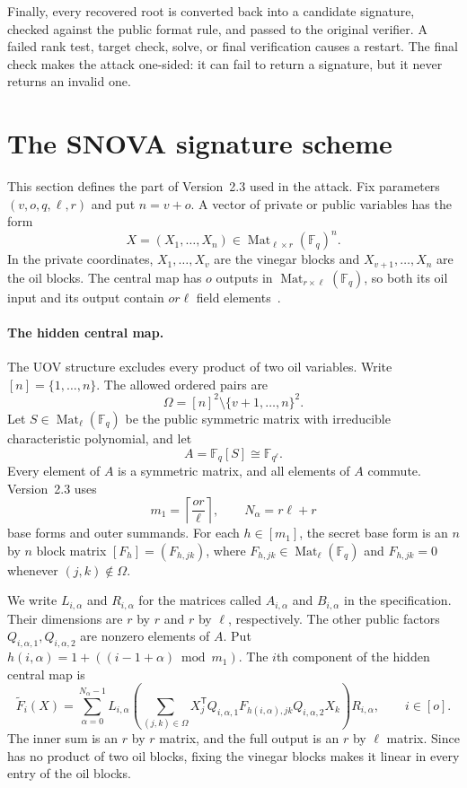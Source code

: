 \documentclass[11pt]{article}
\newcommand{\F}{\mathbb F}
\newcommand{\Mat}{\operatorname{Mat}}
\newcommand{\transpose}{\mathsf T}
\newcommand{\SNOVA}{\textsf{SNOVA}}
\begin{document}
Finally, every recovered root is converted back into a candidate signature,
checked against the public format rule, and passed to the original verifier.
A failed rank test, target check, solve, or final verification causes a
restart.  The final check makes the attack one-sided: it can fail to return a
signature, but it never returns an invalid one.

\section{The \SNOVA{} signature scheme}\label{sec:scheme}

This section defines the part of Version~2.3 used in the attack.  Fix
parameters $(v,o,q,\ell,r)$ and put $n=v+o$.  A vector of private or public
variables has the form
\[
 X=(X_1,\ldots,X_n)\in\Mat_{\ell\times r}(\F_q)^n.
\]
In the private coordinates, $X_1,\ldots,X_v$ are the vinegar blocks and
$X_{v+1},\ldots,X_n$ are the oil blocks.  The central map has $o$ outputs in
$\Mat_{r\times\ell}(\F_q)$, so both its oil input and its output contain
$or\ell$ field elements~\cite{KipnisPatarinGoubin1999,SNOVA23}.

\paragraph{The hidden central map.}
The UOV structure excludes every product of two oil variables.  Write
$[n]=\{1,\ldots,n\}$.  The allowed ordered pairs are
\begin{equation}
 \Omega=[n]^2\setminus\{v+1,\ldots,n\}^2.
 \label{eq:scheme-omega}
\end{equation}
Let $S\in\Mat_\ell(\F_q)$ be the public symmetric matrix with irreducible
characteristic polynomial, and let
\[
 A=\F_q[S]\cong\F_{q^\ell}.
\]
Every element of $A$ is a symmetric matrix, and all elements of $A$ commute.
Version~2.3 uses
\[
 m_1=\left\lceil\frac{or}{\ell}\right\rceil,
 \qquad N_\alpha=r\ell+r
\]
base forms and outer summands.  For each $h\in[m_1]$, the secret base form is
an $n$ by $n$ block matrix $[F_h]=(F_{h,jk})$, where
$F_{h,jk}\in\Mat_\ell(\F_q)$ and $F_{h,jk}=0$ whenever
$(j,k)\notin\Omega$.

We write $L_{i,\alpha}$ and $R_{i,\alpha}$ for the matrices called
$A_{i,\alpha}$ and $B_{i,\alpha}$ in the specification.  Their dimensions are
$r$ by $r$ and $r$ by $\ell$, respectively.  The other public factors
$Q_{i,\alpha,1},Q_{i,\alpha,2}$ are nonzero elements of $A$.  Put
$h(i,\alpha)=1+((i-1+\alpha)\bmod m_1)$.  The $i$th component of the hidden
central map is
\begin{equation}
 \widetilde F_i(X)=
 \sum_{\alpha=0}^{N_\alpha-1} L_{i,\alpha}
 \left(
   \sum_{(j,k)\in\Omega}
   X_j^\transpose
   Q_{i,\alpha,1}F_{h(i,\alpha),jk}Q_{i,\alpha,2}X_k
 \right)R_{i,\alpha},
 \qquad i\in[o].
 \label{eq:scheme-central}
\end{equation}
The inner sum is an $r$ by $r$ matrix, and the full output is an $r$ by
$\ell$ matrix.  Since  has no product of two oil
blocks, fixing the vinegar blocks makes it linear in every entry of the oil
blocks.
\end{document}
